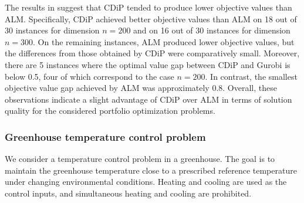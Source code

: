 \documentclass[11pt,a4paper,reqno]{amsart}
\begin{document}
{The results in  suggest that CDiP tended to produce lower objective values than ALM. Specifically, CDiP achieved better objective values than ALM on 18 out of 30 instances for dimension $n=200$ and on 16 out of 30 instances for dimension $n=300$. On the remaining instances, ALM produced lower objective values, but the differences from those obtained by CDiP were comparatively small. Moreover, there are 5 instances where the optimal value gap between CDiP and Gurobi is below 0.5, four of which correspond to the case $n=200$. In contrast, the smallest objective value gap achieved by ALM was approximately 0.8. Overall, these observations indicate a slight advantage of CDiP over ALM in terms of solution quality for the considered portfolio optimization problems. 
\subsubsection{Greenhouse temperature control problem}
\rm We consider a temperature control problem in a greenhouse. The goal is to maintain the greenhouse temperature close to a prescribed reference temperature under changing environmental conditions. Heating and cooling are used as the control inputs, and simultaneous heating and cooling are prohibited. %
%
}
\end{document}
